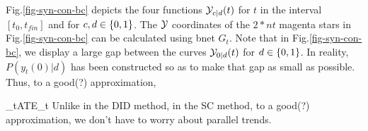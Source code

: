 Fig.\ref{fig-syn-con-bc}
depicts the
four functions
${\cal Y}_{c| d}(t)$
for $t$ in the interval  $[t_0, t_{fin}]$
and for $c, d\in \{0,1\}$.
The ${\cal Y}$ coordinates
of the $2*nt$ magenta stars in 
Fig.\ref{fig-syn-con-bc} can 
be calculated using bnet $G_t$.
Note that in Fig.\ref{fig-syn-con-bc},
we display a large gap
between the curves ${\cal Y}_{0| d}(t)$
for $ d\in \{0,1\}$.
In reality, $P(y_t(0)| d)$ has been
constructed so as to make that
gap as small as possible.
Thus, to a good(?) approximation,

\beq
\delta_t\approx ATE_t
\eeq
Unlike in the DID method,
in the SC method, to a good(?)
approximation, we don't have to worry
about parallel trends.